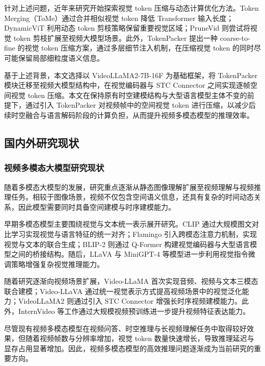 针对上述问题，近年来研究开始探索视觉 token 压缩与动态计算优化方法。Token Merging（ToMe）通过合并相似视觉 token 降低 Transformer 输入长度\cite{tome2023}；DynamicViT 利用动态 token 剪枝策略保留重要视觉区域\cite{dynamicvit2021}；PruneVid 则尝试将视觉 token 剪枝扩展至视频大模型场景\cite{prunevid2024}。此外，TokenPacker 提出一种 coarse-to-fine 的视觉 token 压缩方案，通过多层细节注入机制，在压缩视觉 token 的同时尽可能保留局部细粒度语义信息\cite{tokenpacker2024}。

基于上述背景，本文选择以 VideoLLaMA2-7B-16F 为基础框架，将 TokenPacker 模块迁移至视频大模型结构中，在视觉编码器与 STC Connector 之间实现逐帧空间视觉 token 压缩。本文在保持原有时空建模结构与大型语言模型主体不变的前提下，通过引入 TokenPacker 对视频帧中的空间视觉 token 进行压缩，以减少后续时空融合与语言解码阶段的计算负担，从而提升视频多模态模型的推理效率。

\subsection{国内外研究现状}

\subsubsection{视频多模态大模型研究现状}

随着多模态大模型的发展，研究重点逐渐从静态图像理解扩展至视频理解与视频推理任务。相较于图像场景，视频不仅包含空间语义信息，还具有复杂的时间动态关系，因此模型需要同时具备空间建模与时序建模能力。

早期多模态模型主要围绕视觉与文本统一表示展开研究。CLIP 通过大规模图文对比学习实现视觉与语言特征的统一对齐\cite{clip2021}；Flamingo 引入跨模态注意力机制，实现视觉与文本的联合生成\cite{flamingo2022}；BLIP-2 则通过 Q-Former 构建视觉编码器与大型语言模型之间的桥接结构\cite{blip22023}。随后，LLaVA 与 MiniGPT-4 等模型进一步利用视觉指令微调策略增强复杂视觉推理能力\cite{llava2023,minigpt42023}。

随着研究逐渐向视频场景扩展，Video-LLaMA 首次实现音频、视频与文本三模态联合建模\cite{videollama2023}；Video-LLaVA 通过统一视觉表示方式提高视频场景中的视觉泛化能力\cite{videollava2023}；VideoLLaMA2 则通过引入 STC Connector 增强长时序视频建模能力\cite{videollama22024}。此外，InternVideo 等工作通过大规模视频预训练进一步提升视频特征表达能力\cite{internvideo2023}。

尽管现有视频多模态模型在视频问答、时空推理与长视频理解任务中取得较好效果，但随着视频帧数与分辨率增加，视觉 token 数量快速增长，导致推理延迟与显存占用显著增加。因此，视频多模态模型的高效推理问题逐渐成为当前研究的重要方向。

